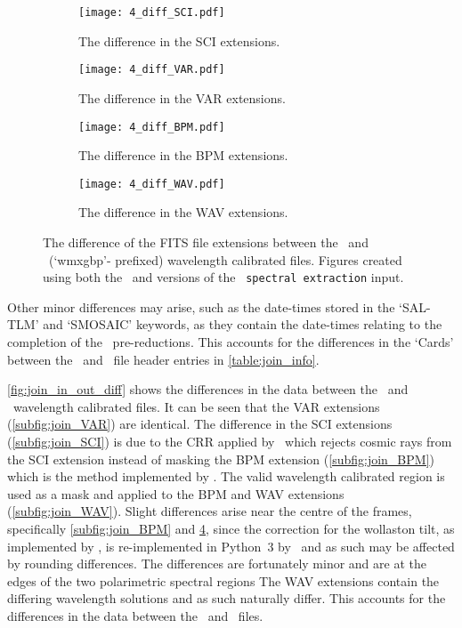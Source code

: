 \begin{figure}
    \centering
    \begin{subfigure}[b]{\textwidth}
        \centering
        \texttt{[image: 4\_diff\_SCI.pdf]}
        \caption{The difference in the \gls{SCI} extensions.}
        \label{subfig:join_SCI}
    \end{subfigure}
    \hfill
    \begin{subfigure}[b]{\textwidth}
        \centering
        \texttt{[image: 4\_diff\_VAR.pdf]}
        \caption{The difference in the \gls{VAR} extensions.}
        \label{subfig:join_VAR}
    \end{subfigure}
    \hfill
    \begin{subfigure}[b]{\textwidth}
        \centering
        \texttt{[image: 4\_diff\_BPM.pdf]}
        \caption{The difference in the \gls{BPM} extensions.}
        \label{subfig:join_BPM}
    \end{subfigure}
    \hfill
    \begin{subfigure}[b]{\textwidth}
        \centering
        \texttt{[image: 4\_diff\_WAV.pdf]}
        \caption{The difference in the \gls{WAV} extensions.}
        \label{subfig:join_WAV}
    \end{subfigure}
    \caption{The difference of the \gls{FITS} file extensions between the \polsalt\ and \stops\ (`wmxgbp'- prefixed) wavelength calibrated files. Figures created using both the \polsalt\ and \stops versions of the \polsalt\ \texttt{spectral extraction} input.}
    \label{fig:join_in_out_diff}
\end{figure}

Other minor differences may arise, such as the date-times stored in the `SAL-TLM' and `SMOSAIC' keywords, as they contain the date-times relating to the completion of the \polsalt\ pre-reductions.
This accounts for the differences in the `Cards' between the \polsalt\ and \stops\ file header entries in \autoref{table:join_info}.

\autoref{fig:join_in_out_diff} shows the differences in the data between the \polsalt\ and \stops\ wavelength calibrated files.
It can be seen that the \gls{VAR} extensions (\autoref{subfig:join_VAR}) are identical.
The difference in the \gls{SCI} extensions (\autoref{subfig:join_SCI}) is due to the \gls{CRR} applied by \stops\, which rejects cosmic rays from the \gls{SCI} extension instead of masking the \gls{BPM} extension (\autoref{subfig:join_BPM}) which is the method implemented by \polsalt.
The valid wavelength calibrated region is used as a mask and applied to the \gls{BPM} and \gls{WAV} extensions (\autoref{subfig:join_WAV}).
Slight differences arise near the centre of the frames, specifically \autoref{subfig:join_BPM} and \ref{subfig:join_WAV}, since the correction for the wollaston tilt, as implemented by \polsalt, is re-implemented in Python~$3$ by \stops\ and as such may be affected by rounding differences.
The differences are fortunately minor and are at the edges of the two polarimetric spectral regions
The \gls{WAV} extensions contain the differing wavelength solutions and as such naturally differ.
This accounts for the differences in the data between the \polsalt\ and \stops\ files.

